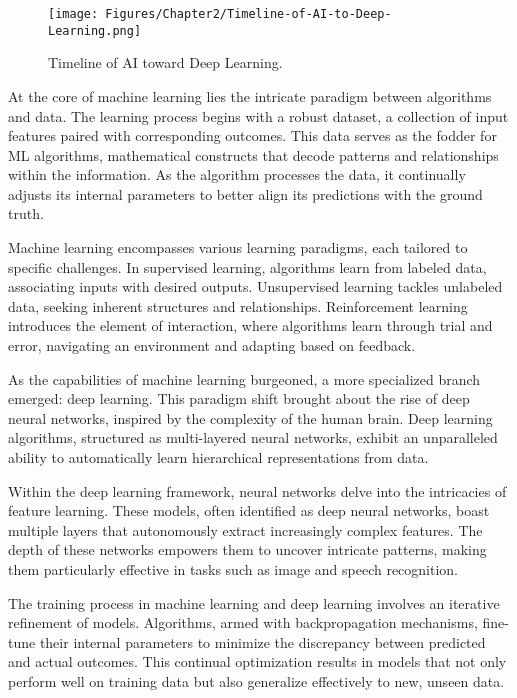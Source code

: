\begin{figure}[th]
    \centering
    \texttt{[image: Figures/Chapter2/Timeline-of-AI-to-Deep-Learning.png]}
    \caption[Timeline of AI to Deep Learning.]{Timeline of AI toward Deep Learning.}
    \label{fig:TimelineAI}
\end{figure}

At the core of machine learning lies the intricate paradigm between algorithms and data. The learning process begins with a robust dataset, a collection of input features paired with corresponding outcomes. This data serves as the fodder for ML algorithms, mathematical constructs that decode patterns and relationships within the information. As the algorithm processes the data, it continually adjusts its internal parameters to better align its predictions with the ground truth.

Machine learning encompasses various learning paradigms, each tailored to specific challenges. In supervised learning, algorithms learn from labeled data, associating inputs with desired outputs. Unsupervised learning tackles unlabeled data, seeking inherent structures and relationships. Reinforcement learning introduces the element of interaction, where algorithms learn through trial and error, navigating an environment and adapting based on feedback.

As the capabilities of machine learning burgeoned, a more specialized branch emerged: deep learning. This paradigm shift brought about the rise of deep neural networks, inspired by the complexity of the human brain. Deep learning algorithms, structured as multi-layered neural networks, exhibit an unparalleled ability to automatically learn hierarchical representations from data.

Within the deep learning framework, neural networks delve into the intricacies of feature learning. These models, often identified as deep neural networks, boast multiple layers that autonomously extract increasingly complex features. The depth of these networks empowers them to uncover intricate patterns, making them particularly effective in tasks such as image and speech recognition.

The training process in machine learning and deep learning involves an iterative refinement of models. Algorithms, armed with backpropagation mechanisms, fine-tune their internal parameters to minimize the discrepancy between predicted and actual outcomes. This continual optimization results in models that not only perform well on training data but also generalize effectively to new, unseen data.

